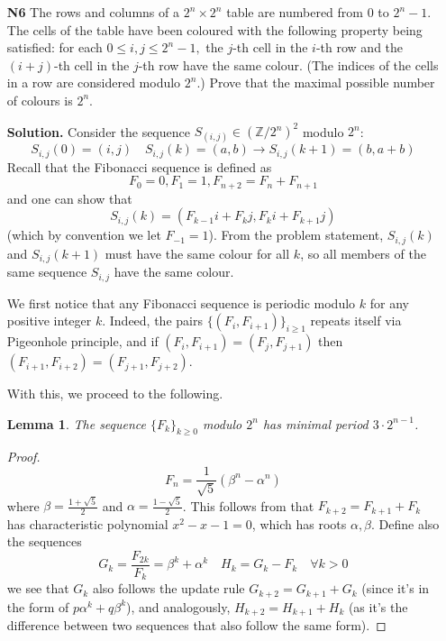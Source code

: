 \documentclass[11pt]{article}
\newcommand{\bbZ}{\mathbb Z}
\newcommand{\bbN}{\mathbb N}
\newcommand{\<}{\langle}
\renewcommand{\>}{\rangle}
\newtheorem{lemma}{Lemma}
\begin{document}
\begin{enumerate}
	Now by this lemma, $g(n+1)-g(n)=\pm 1$. We first show that the direction has to be monotonic: 
	otherwise, let $n$ be the place it changes direction, then 
	$g(n+1)-g(n)=-(g(n)-g(n-1))$, and $g(n-1)=g(n+1)$, which violates the lemma for all primes $p\neq 2$. 
	If $g(n+1)-g(n)=-1$ for all $n$ then $g(g(1)+1)=g(1)-g(1)=0\not\in \bbN$, which isn't allowed either. 
	Hence we have $g(n+1)-g(n)=1$ for all $n$ and therefore 
	$g(n)=n+c$ for some integer $c\ge 0$. 
	This function would work since the given equation will be $(m+n+c)^2$. 
	
	\item[\textbf{N6}] The rows and columns of a $2^n \times 2^n$ table are numbered from $0$ to $2^{n}-1.$ The cells of the table have been coloured with the following property being satisfied: for each $0 \leq i,j \leq 2^n - 1,$ the $j$-th cell in the $i$-th row and the $(i+j)$-th cell in the $j$-th row have the same colour. (The indices of the cells in a row are considered modulo $2^n$.) Prove that the maximal possible number of colours is $2^n$.
	
	\textbf{Solution.} Consider the sequence $S_{(i, j)}\in (\bbZ/2^n)^2$ modulo $2^n$: 
	\[
	S_{i, j}(0)=(i, j)\quad S_{i, j}(k) = (a, b)\to S_{i, j}(k+1)=(b, a+b) 
	\]
	Recall that the Fibonacci sequence is defined as
	\[
	F_0=0, F_1=1, F_{n+2}=F_n+F_{n+1}
	\]
	and one can show that 
	\[
	S_{i, j}(k)=(F_{k-1}i+F_{k}j, F_{k}i+F_{k+1}j)
	\]
	(which by convention we let $F_{-1}=1$). 
	From the problem statement, $S_{i, j}(k)$ and $S_{i, j}(k+1)$ must have the same colour for all $k$, 
	so all members of the same sequence $S_{i, j}$ have the same colour. 
	
	We first notice that any Fibonacci sequence is periodic modulo $k$ for any positive integer $k$. Indeed, the pairs $\{(F_i, F_{i+1})\}_{i\ge 1}$ repeats itself via Pigeonhole principle, and if $(F_i, F_{i+1})=(F_j, F_{j+1})$ then $(F_{i+1}, F_{i+2})=(F_{j+1}, F_{j+2})$. 
	
	With this, we proceed to the following. 
	\begin{lemma}
		The sequence $\{F_k\}_{k\ge 0}$ modulo $2^n$ has minimal period $3\cdot 2^{n-1}$. 
	\end{lemma}
	
	\begin{proof}
		\[
		F_n=\frac{1}{\sqrt{5}}(\beta^n-\alpha^n)
		\]
		where $\beta=\frac{1+\sqrt{5}}{2}$ and $\alpha=\frac{1-\sqrt{5}}{2}$. 
		This follows from that $F_{k+2}=F_{k+1}+F_k$ has characteristic polynomial $x^2-x-1=0$, which has roots $\alpha, \beta$. 
		Define also the sequences
		\[
		G_k = \frac{F_{2k}}{F_k}=\beta^k+\alpha^k \quad H_k = G_k-F_k\quad \forall k>0
		\]
		we see that $G_k$ also follows the update rule $G_{k+2}=G_{k+1}+G_k$ 
		(since it's in the form of $p\alpha^k+q\beta^k$), 
		and analogously, $H_{k+2}=H_{k+1}+H_k$ (as it's the difference between two sequences that also follow the same form). 
		

\end{proof}
\end{enumerate}
\end{document}
